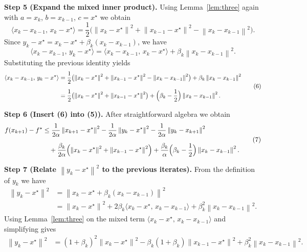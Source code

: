 \documentclass{article}
\newcommand{\norm}[1]{\left\|#1\right\|}
\begin{document}
\bigskip
\noindent\textbf{Step 5 (Expand the mixed inner product).}
Using Lemma~\ref{lem:three} again with
\(a=x_k\), \(b=x_{k-1}\), \(c=x^\star\) we obtain
\[
\langle x_k-x_{k-1},\,x_k-x^\star\rangle
   =\frac12\bigl(\norm{x_k-x^\star}^2+\norm{x_{k-1}-x^\star}^2
                -\norm{x_k-x_{k-1}}^2\bigr).
\]
Since \(y_k-x^\star = x_k-x^\star+\beta_k(x_k-x_{k-1})\), we have
\[
\langle x_k-x_{k-1},\,y_k-x^\star\rangle
   =\langle x_k-x_{k-1},\,x_k-x^\star\rangle
    +\beta_k\norm{x_k-x_{k-1}}^2 .
\]
Substituting the previous identity yields
\[
\begin{aligned}
\langle x_k-x_{k-1},\,y_k-x^\star\rangle
&= \frac12\bigl(\norm{x_k-x^\star}^2+\norm{x_{k-1}-x^\star}^2
                -\norm{x_k-x_{k-1}}^2\bigr)
   +\beta_k\norm{x_k-x_{k-1}}^2 \\[2mm]
&= \frac12\bigl(\norm{x_k-x^\star}^2+\norm{x_{k-1}-x^\star}^2\bigr)
   +\Bigl(\beta_k-\frac12\Bigr)\norm{x_k-x_{k-1}}^2 .
\end{aligned}
\tag{6}
\]

\bigskip
\noindent\textbf{Step 6 (Insert (6) into (5)).}
After straightforward algebra we obtain
\[
\begin{aligned}
f(x_{k+1})-f^\star
&\le \frac{1}{2\alpha}\norm{x_{k+1}-x^\star}^2
   -\frac{1}{2\alpha}\norm{y_k-x^\star}^2
   -\frac{1}{2\alpha}\norm{y_k-x_{k+1}}^2   \\[2mm]
&\quad +\frac{\beta_k}{2\alpha}
   \Bigl(\norm{x_k-x^\star}^2+\norm{x_{k-1}-x^\star}^2\Bigr)
   +\frac{\beta_k}{\alpha}\Bigl(\beta_k-\frac12\Bigr)\norm{x_k-x_{k-1}}^2 .
\end{aligned}
\tag{7}
\]

\bigskip
\noindent\textbf{Step 7 (Relate \(\norm{y_k-x^\star}^2\) to the previous
iterates).}
From the definition of \(y_k\) we have
\[
\begin{aligned}
\norm{y_k-x^\star}^2
&= \norm{x_k-x^\star+\beta_k(x_k-x_{k-1})}^2\\
&= \norm{x_k-x^\star}^2
   +2\beta_k\langle x_k-x^\star,\,x_k-x_{k-1}\rangle
   +\beta_k^2\norm{x_k-x_{k-1}}^2 .
\end{aligned}
\tag{8}
\]
Using Lemma~\ref{lem:three} on the mixed term
\(\langle x_k-x^\star,\,x_k-x_{k-1}\rangle\) and simplifying gives
\[
\begin{aligned}
\norm{y_k-x^\star}^2
&= (1+\beta_k)^2\norm{x_k-x^\star}^2
   -\beta_k(1+\beta_k)\norm{x_{k-1}-x^\star}^2
   +\beta_k^2\norm{x_k-x_{k-1}}^2 .
\end{aligned}
\tag{9}
\]
\end{document}

